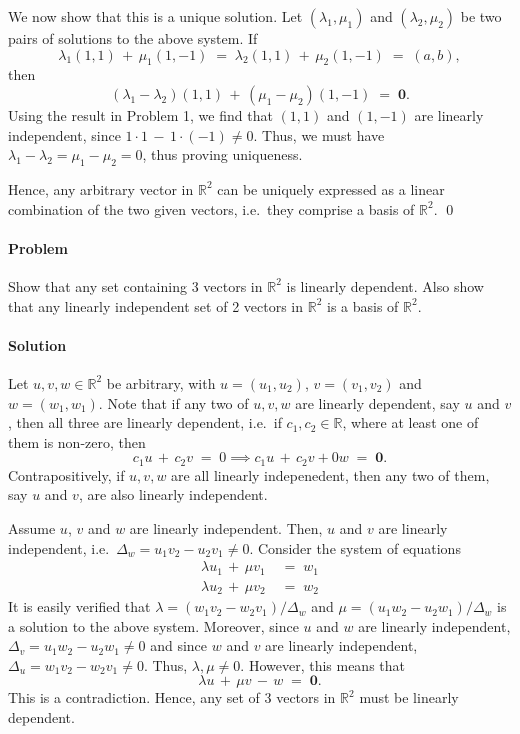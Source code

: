 \documentclass[10pt]{article}
\newcounter{prob}
\def\problem{\stepcounter{prob}\paragraph{Problem \arabic{prob}}}
\def\solution{\paragraph{Solution}}
\let\vec\mathbf
\begin{document}
\begin{enumerate}
                We now show that this is a unique solution. Let $(\lambda_1, \mu_1)$ and $(\lambda_2, \mu_2)$ be two pairs of solutions
                to the above system. If
                \[
                \lambda_1(1, 1) \,+\, \mu_1(1, -1) \;=\; \lambda_2(1, 1) \,+\, \mu_2(1, -1) \;=\; (a, b),
                \]
                then 
                \[
                (\lambda_1 - \lambda_2)(1, 1) \,+\, (\mu_1 - \mu_2)(1, -1) \;=\; \vec{0}.
                \]
                Using the result in Problem 1, we find that $(1, 1)$ and $(1, -1)$ are linearly independent, since $1\cdot 1 \,-\, 1\cdot (-1) \neq 0$.
                Thus, we must have $\lambda_1 - \lambda_2 = \mu_1 - \mu_2 = 0$, thus proving uniqueness.

                Hence, any arbitrary vector in $\mathbb{R}^2$ can be uniquely expressed as a linear combination of the two given vectors, i.e.\ 
                they comprise a basis of $\mathbb{R}^2$. \qed
        \end{enumerate}

        \problem Show that any set containing 3 vectors in $\mathbb{R}^2$ is linearly dependent. Also show that any linearly independent set
        of 2 vectors in $\mathbb{R}^2$ is a basis of $\mathbb{R}^2$.

        \solution Let $u, v, w \in \mathbb{R}^2$ be arbitrary, with $u = (u_1, u_2)$, $v = (v_1, v_2)$ and $w = (w_1, w_1)$.
        Note that if any two of $u, v, w$ are linearly dependent, say $u$ and $v$, then all three are linearly dependent, i.e.\ 
        if $c_1, c_2 \in \mathbb{R}$, where at least one of them is non-zero, then
        \[
                c_1 u \,+\, c_2 v \;=\; 0 \implies c_1 u \,+\, c_2 v + 0w \;=\; \vec{0}.
        \]
        Contrapositively, if $u, v, w$ are all linearly indepenedent, then any two of them, say $u$ and $v$, are also linearly independent.

        Assume $u$, $v$ and $w$ are linearly independent. Then, $u$ and $v$ are linearly independent, i.e.\ $\Delta_w = u_1v_2 - u_2v_1 \neq 0$.
        Consider the system of equations
        \begin{align*}
                \lambda u_1 \,+\, \mu v_1 \;&=\; w_1 \\
                \lambda u_2 \,+\, \mu v_2 \;&=\; w_2 
        \end{align*}
        It is easily verified that $\lambda = (w_1v_2 - w_2v_1)/\Delta_w$ and $\mu = (u_1w_2 - u_2w_1)/\Delta_w$ is a solution to the above system.
        Moreover, since $u$ and $w$ are linearly independent, $\Delta_v = u_1w_2 - u_2w_1 \neq 0$ and since $w$ and $v$ are linearly independent,
        $\Delta_u = w_1v_2 - w_2v_1 \neq 0$. Thus, $\lambda, \mu \neq 0$. However, this means that
        \[
        \lambda u \,+\, \mu v \,-\, w \;=\; \vec{0}.
        \]
        This is a contradiction. Hence, any set of 3 vectors in $\mathbb{R}^2$ must be linearly dependent.
\end{document}
